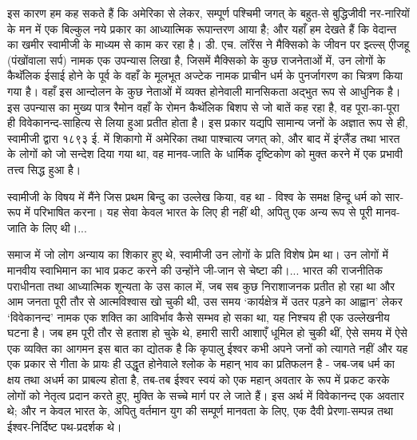 इस कारण हम कह सकते हैं कि अमेरिका से लेकर, सम्पूर्ण पश्चिमी जगत् के बहुत-से बुद्धिजीवी नर-नारियों के मन में एक बिल्कुल नये प्रकार का आध्यात्मिक रूपान्तरण आया है; और यहाँ हम देखते हैं कि वेदान्त का खमीर स्वामीजी के माध्यम से काम कर रहा है। डी. एच. लॉरेंस ने मैक्सिको के जीवन पर झ्त्ल्स् एीजहू (पंखोंवाला सर्प) नामक एक उपन्यास लिखा है, जिसमें मैक्सिको के कुछ राजनेताओं में, उन लोगों के कैथॅलिक ईसाई होने के पूर्व के वहाँ के मूलभूत अज्टेक नामक प्राचीन धर्म के पुनर्जागरण का चित्रण किया गया है। वहाँ इस आन्दोलन के कुछ नेताओं में व्यक्त होनेवाली मानसिकता अद्भुत रूप से आधुनिक है। इस उपन्यास का मुख्य पात्र रैमोन वहाँ के रोमन कैथॅलिक बिशप से जो बातें कह रहा है, वह पूरा-का-पूरा ही विवेकानन्द-साहित्य से लिया हुआ प्रतीत होता है। इस प्रकार यद्यपि सामान्य जनों के अज्ञात रूप से ही, स्वामीजी द्वारा १८९३ ई. में शिकागो में अमेरिका तथा पाश्चात्य जगत् को, और बाद में इंग्लैंड तथा भारत के लोगों को जो सन्देश दिया गया था, वह मानव-जाति के धार्मिक दृष्टिकोण को मुक्त करने में एक प्रभावी तत्त्व सिद्ध हुआ है। 

\vskip 2pt

स्वामीजी के विषय में मैंने जिस प्रथम बिन्दु का उल्लेख किया, वह था - विश्व के समक्ष हिन्दू धर्म को सार-रूप में परिभाषित करना। यह सेवा केवल भारत के लिए ही नहीं थी, अपितु एक अन्य रूप से पूरी मानव-जाति के लिए थी।... 

\vskip 2pt

समाज में जो लोग अन्याय का शिकार हुए थे, स्वामीजी उन लोगों के प्रति विशेष प्रेम था। उन लोगों में मानवीय स्वाभिमान का भाव प्रकट करने की उन्होंने जी-जान से चेष्टा की।... भारत की राजनीतिक पराधीनता तथा आध्यात्मिक शून्यता के उस काल में, जब सब कुछ निराशाजनक प्रतीत हो रहा था और आम जनता पूरी तौर से आत्मविश्वास खो चुकी थी, उस समय ‘कार्यक्षेत्र में उतर पड़ने का आह्वान’ लेकर ‘विवेकानन्द’ नामक एक शक्ति का आविर्भाव कैसे सम्भव हो सका था, यह निश्चय ही एक उल्लेखनीय घटना है। जब हम पूरी तौर से हताश हो चुके थे, हमारी सारी आशाएँ धूमिल हो चुकी थीं, ऐसे समय में ऐसे एक व्यक्ति का आगमन इस बात का द्योतक है कि कृपालु ईश्वर कभी अपने जनों को त्यागते नहीं और यह एक प्रकार से गीता के प्रायः ही उद्धृत होनेवाले श्लोक के महान् भाव का प्रतिफलन है - जब-जब धर्म का क्षय तथा अधर्म का प्राबल्य होता है, तब-तब ईश्वर स्वयं को एक महान् अवतार के रूप में प्रकट करके लोगों को नेतृत्व प्रदान करते हुए, मुक्ति के सच्चे मार्ग पर ले जाते हैं। इस अर्थ में विवेकानन्द एक अवतार थे; और न केवल भारत के, अपितु वर्तमान युग की सम्पूर्ण मानवता के लिए, एक दैवी प्रेरणा-सम्पन्न तथा ईश्वर-निर्दिष्ट पथ-प्रदर्शक थे। 

\vskip 2pt


